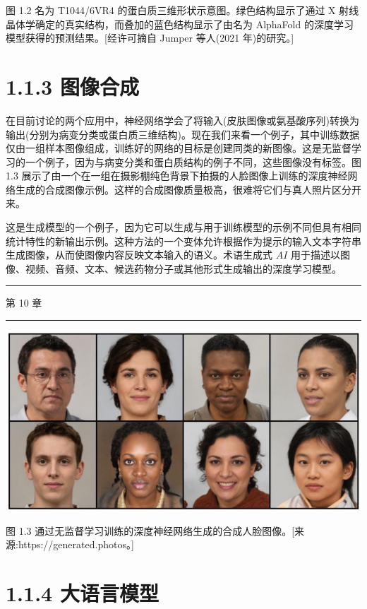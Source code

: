 \documentclass[10pt]{report}
\newcommand{\HRule}{\begin{center}\rule{0.9\linewidth}{0.2mm}\end{center}}
\begin{document}
图 1.2 名为 T1044/6VR4 的蛋白质三维形状示意图。绿色结构显示了通过 X 射线晶体学确定的真实结构，而叠加的蓝色结构显示了由名为 AlphaFold 的深度学习模型获得的预测结果。[经许可摘自 Jumper 等人(2021 年)的研究。]

\section*{1.1.3 图像合成}

在目前讨论的两个应用中，神经网络学会了将输入(皮肤图像或氨基酸序列)转换为输出(分别为病变分类或蛋白质三维结构)。现在我们来看一个例子，其中训练数据仅由一组样本图像组成，训练好的网络的目标是创建同类的新图像。这是无监督学习的一个例子，因为与病变分类和蛋白质结构的例子不同，这些图像没有标签。图 1.3 展示了由一个在一组在摄影棚纯色背景下拍摄的人脸图像上训练的深度神经网络生成的合成图像示例。这样的合成图像质量极高，很难将它们与真人照片区分开来。

这是生成模型的一个例子，因为它可以生成与用于训练模型的示例不同但具有相同统计特性的新输出示例。这种方法的一个变体允许根据作为提示的输入文本字符串生成图像，从而使图像内容反映文本输入的语义。术语生成式 \({AI}\) 用于描述以图像、视频、音频、文本、候选药物分子或其他形式生成输出的深度学习模型。

\HRule

第 10 章

\HRule

\begin{center}
\includegraphics[max width=1.0\textwidth]{images/0194e279-9b28-703a-88f4-c3ac21e2010d_24_231_352_1337_677_0.jpg}
\end{center}
\hspace*{3em} 

图 1.3 通过无监督学习训练的深度神经网络生成的合成人脸图像。[来源:https://generated.photos。]

\section*{1.1.4 大语言模型}
\end{document}
